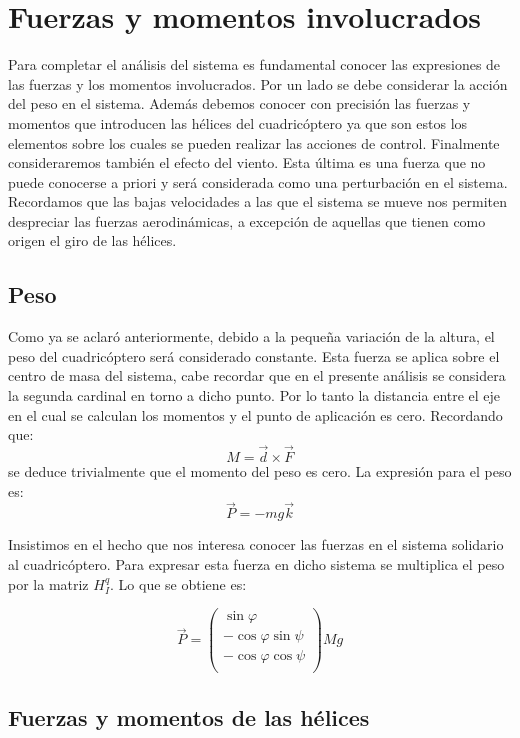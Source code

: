 \documentclass[main]{subfiles}
\begin{document}
\section{Fuerzas y momentos involucrados}
\label{FYT}

Para completar el an\'alisis del sistema es fundamental conocer las expresiones de las fuerzas y los momentos involucrados. Por un lado se debe considerar la acci\'on del peso en el sistema. Adem\'as debemos conocer con precisi\'on las fuerzas y momentos que introducen las h\'elices del cuadric\'optero ya que son estos los elementos sobre los cuales se pueden realizar las acciones de control. Finalmente consideraremos tambi\'en el efecto del viento. Esta \'ultima es una fuerza que no puede conocerse a priori y ser\'a considerada como una perturbaci\'on en el sistema. Recordamos que las bajas velocidades a las que el sistema se mueve nos permiten despreciar las fuerzas aerodin\'amicas, a excepci\'on de aquellas que tienen como origen el giro de las h\'elices.
\subsection{Peso}
Como ya se aclar\'o anteriormente, debido a la peque\~na variaci\'on de la altura, el peso del cuadric\'optero ser\'a considerado constante. Esta fuerza se aplica sobre el centro de masa del sistema, cabe recordar que en el presente an\'alisis se considera la segunda cardinal en torno a dicho punto. Por lo tanto la distancia entre el eje en el cual se calculan los momentos y el punto de aplicaci\'on es cero. Recordando que: $$
M=\vec{d}\times\vec{F}
$$
se deduce trivialmente que el momento del peso es cero. La expresi\'on para el peso es:
$$
\vec{P}=-mg\vec{k}
$$

Insistimos en el hecho que nos interesa conocer las fuerzas en el sistema solidario al cuadric\'optero. Para expresar esta fuerza en dicho sistema se multiplica el peso por la matriz $H_I^q$. Lo que se obtiene es:

$$
\vec{P}=\left(\begin{array}{c}
\sin\varphi\\
-\cos\varphi\sin\psi\\
-\cos\varphi\cos\psi\\
\end{array}\right)Mg
$$
\subsection{Fuerzas y momentos de las h\'elices}
\end{document}

